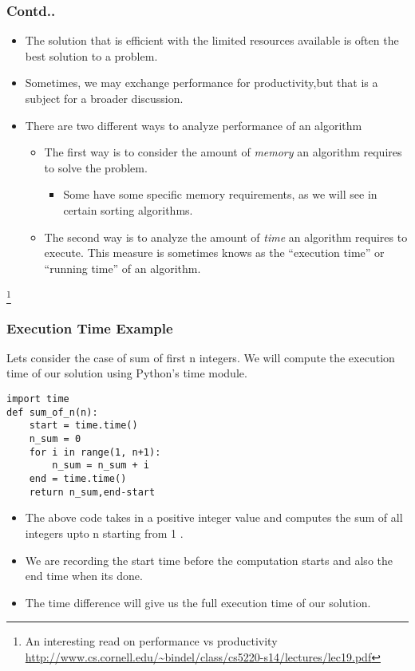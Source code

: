 \documentclass{beamer}
\begin{document}
\begin{frame}
\frametitle{Contd..}
\begin{itemize}
\item The solution that is efficient with the limited resources available is often the best solution to a problem.
\item Sometimes, we may exchange performance for productivity,but that is a subject for a broader discussion.
\item There are two different ways to analyze performance of an algorithm
\begin{itemize}
\item The first way is to consider the amount of \textit{memory} an algorithm requires to solve the problem.
\begin{itemize} 
\item Some have some specific memory requirements, as we will see in certain sorting algorithms.
\end{itemize}
\item The second way is to analyze the amount of \textit{time} an algorithm requires to execute. This measure is sometimes knows as the “execution time” or “running time” of an algorithm.
\end{itemize}
\end{itemize}
\footnote{An interesting read on performance vs productivity \url{http://www.cs.cornell.edu/~bindel/class/cs5220-s14/lectures/lec19.pdf}}
\end{frame}

\begin{frame}[fragile]
\frametitle{Execution Time Example}
Lets consider the case of sum of first n integers. We will compute the execution time of our solution using Python's time module.

\begin{lstlisting}
import time
def sum_of_n(n):
    start = time.time()
    n_sum = 0
    for i in range(1, n+1):
        n_sum = n_sum + i
    end = time.time()
    return n_sum,end-start
\end{lstlisting}
\begin{itemize}
\item The above code takes in a positive integer value and computes the sum of all integers upto n starting from 1	.
\item We are recording the start time before the computation starts and also the end time when its done.
\item The time difference will give us the full execution time of our solution.
\end{itemize}

\end{frame}
\end{document}
